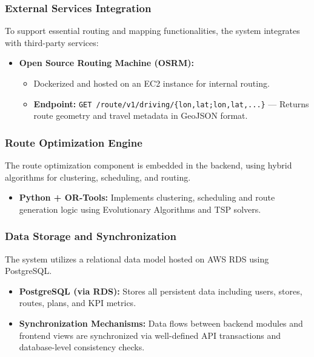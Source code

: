 \subsubsection{External Services Integration}
To support essential routing and mapping functionalities, the system integrates with third-party services:

\begin{itemize}
    \item \textbf{Open Source Routing Machine (OSRM):}
    \begin{itemize}
        \item Dockerized and hosted on an EC2 instance for internal routing.
        \item \textbf{Endpoint:} \texttt{GET /route/v1/driving/\{lon,lat;lon,lat,...\}} — Returns route geometry and travel metadata in GeoJSON format.
    \end{itemize}
\end{itemize}

\subsubsection{Route Optimization Engine}
The route optimization component is embedded in the backend, using hybrid algorithms for clustering, scheduling, and routing.

\begin{itemize}
    \item \textbf{Python + OR-Tools:} Implements clustering, scheduling and route generation logic using Evolutionary Algorithms and TSP solvers.
\end{itemize}

\subsubsection{Data Storage and Synchronization}
The system utilizes a relational data model hosted on AWS RDS using PostgreSQL.

\begin{itemize}
    \item \textbf{PostgreSQL (via RDS):} Stores all persistent data including users, stores, routes, plans, and KPI metrics.
    \item \textbf{Synchronization Mechanisms:} Data flows between backend modules and frontend views are synchronized via well-defined API transactions and database-level consistency checks.
\end{itemize}

